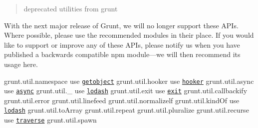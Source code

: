 \begin{quote}
deprecated utilities from grunt \end{quote}


\href{http://travis-ci.org/gruntjs/grunt-legacy-util}{\tt } \href{http://gruntjs.com/}{\tt }

With the next major release of Grunt, we will no longer support these A\+P\+Is. Where possible, please use the recommended modules in their place. If you would like to support or improve any of these A\+P\+Is, please notify us when you have published a backwards compatible npm module---we will then recommend its usage here.

{\ttfamily grunt.\+util.\+namespace} use \href{https://www.npmjs.org/package/getobject}{\tt getobject} {\ttfamily grunt.\+util.\+hooker} use \href{https://www.npmjs.org/package/hooker}{\tt hooker} {\ttfamily grunt.\+util.\+async} use \href{https://www.npmjs.org/package/async}{\tt async} {\ttfamily grunt.\+util.\+\_\+} use \href{https://www.npmjs.org/package/lodash}{\tt lodash} {\ttfamily grunt.\+util.\+exit} use \href{https://www.npmjs.org/package/exit}{\tt exit} {\ttfamily grunt.\+util.\+callbackify} {\ttfamily grunt.\+util.\+error} {\ttfamily grunt.\+util.\+linefeed} {\ttfamily grunt.\+util.\+normalizelf} {\ttfamily grunt.\+util.\+kind\+Of} use \href{https://www.npmjs.org/package/lodash}{\tt lodash} {\ttfamily grunt.\+util.\+to\+Array} {\ttfamily grunt.\+util.\+repeat} {\ttfamily grunt.\+util.\+pluralize} {\ttfamily grunt.\+util.\+recurse} use \href{https://www.npmjs.org/package/traverse}{\tt traverse} {\ttfamily grunt.\+util.\+spawn} 